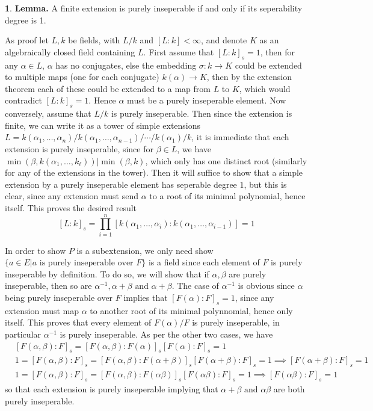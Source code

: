 \documentclass[11pt]{article}
\theoremstyle{definition}
\newtheorem{pb}{}
\newcommand{\set}[1]{\{#1\}}
\newcommand{\tand}{\text{ and }}
\begin{document}
    \begin{pb}
        \textbf{Lemma.} A finite extension is purely inseperable if and only if its seperability degree is 1. 
        
        As proof let \(L,k\) be fields, with \(L/k\) and \([L:k] < \infty\), and denote \(K\) as an algebraically closed field containing \(L\).
        First assume that \([L:k]_s = 1\), then for any \(\alpha \in L\), \(\alpha\) has no conjugates, else the embedding \(\sigma: k \to K\) could be extended to
        multiple maps (one for each conjugate) \(k(\alpha) \to K\), then by the extension theorem each of these could be extended to a map from \(L\)
        to \(K\), which would contradict \([L:k]_s = 1\). Hence \(\alpha\) must be a purely inseperable element. Now conversely, assume that \(L/k\) is purely inseperable.
        Then since the extension is finite, we can write it as a tower of simple extensions \(L = k(\alpha_1,\hdots,\alpha_n)/k(\alpha_1,\hdots,\alpha_{n-1})/\cdots/k(\alpha_1)/k\), it is immediate
        that each extension is purely inseperable, since for \(\beta \in L\), we have \(\min(\beta, k(\alpha_1,\hdots,k_\ell)) \vert \min(\beta,k)\), which only has one distinct root
        (similarly for any of the extensions in the tower).
        Then it will suffice to show that a simple extension by a purely inseperable element has seperable degree \(1\), but this is clear, since any extension must send
        \(\alpha\) to a root of its minimal polynomial, hence itself. This proves the desired result
        \[[L:k]_s = \prod_{i=1}^n[k(\alpha_1,\hdots,\alpha_i):k(\alpha_1,\hdots,\alpha_{i-1})] = 1\]

        In order to show \(P\) is a subextension, we only need show \(\set{a \in E \vert a \text{ is purely inseperable over }F}\) is a field
        since each element of \(F\) is purely inseperable by definition. To do so, we will show that if \(\alpha,\beta\) are purely inseperable, then so are
        \(\alpha^{-1},\alpha + \beta \tand \alpha+\beta\). The case of \(\alpha^{-1}\) is obvious since \(\alpha\) being purely inseperable over \(F\) implies that 
        \([F(\alpha):F]_s = 1\), since any extension must map \(\alpha\) to another root of its minimal polynnomial, hence only itself. This proves that every element of
        \(F(\alpha)/F\) is purely inseperable, in particular \(\alpha^{-1}\) is purely inseperable. As per the other two cases, we have
        \begin{align*}
            &[F(\alpha,\beta):F]_s = [F(\alpha,\beta):F(\alpha)]_s[F(\alpha):F]_s = 1 \\
            &1 = [F(\alpha,\beta):F]_s = [F(\alpha,\beta):F(\alpha+\beta)]_s[F(\alpha+\beta):F]_s = 1 \implies [F(\alpha+\beta):F]_s = 1 \\
            &1 = [F(\alpha,\beta):F]_s = [F(\alpha,\beta):F(\alpha\beta)]_s[F(\alpha\beta):F]_s = 1 \implies [F(\alpha\beta):F]_s = 1
        \end{align*}
        so that each extension is purely inseperable implying that \(\alpha+\beta \tand \alpha \beta\) are both purely inseperable.


\end{pb}
\end{document}
